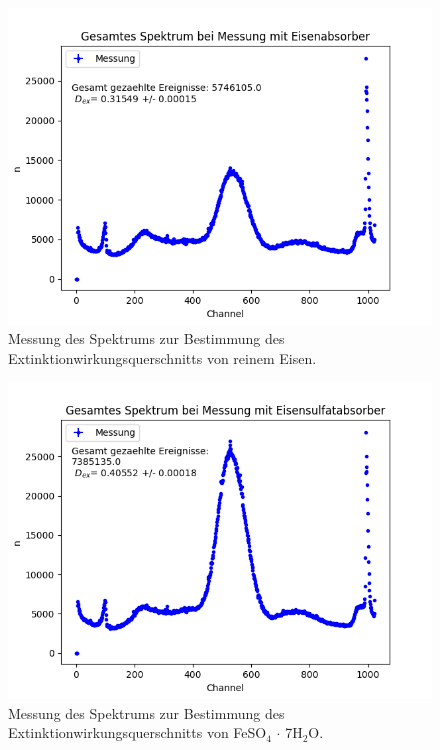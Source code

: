 \documentclass[12pt,a4paper]{article}
\begin{document}
\begin{figure} [H]
\centering
\includegraphics[scale=0.8]{Bilder/Extinktion/Eisen.png}
\caption{Messung des Spektrums zur Bestimmung des Extinktionwirkungsquerschnitts von reinem Eisen.}
\end{figure}

\begin{figure} [H]
\centering
\includegraphics[scale=0.8]{Bilder/Extinktion/Eisensulfat.png}
\caption{Messung des Spektrums zur Bestimmung des Extinktionwirkungsquerschnitts von FeSO$_4$ $\cdot$ 7H$_2$O.}
\end{figure}
\end{document}
